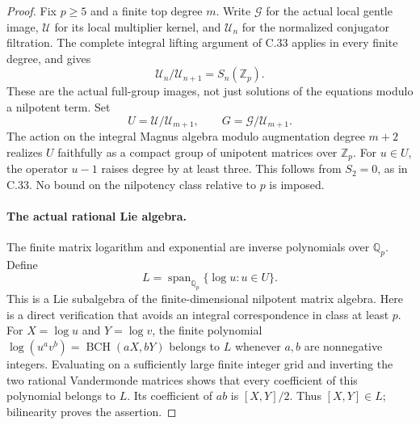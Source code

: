 \begin{proof}
Fix \(p\geq5\) and a finite top degree \(m\).
Write \(\mathcal G\) for the actual local gentle image,
\(\mathcal U\) for its local multiplier kernel, and
\(\mathcal U_n\) for the normalized conjugator filtration.
The complete integral lifting argument of C.33 applies
in every finite degree, and gives
\[
       \mathcal U_n/\mathcal U_{n+1}=S_n(\mathbb Z_p).
                                                               \tag{C38.4}
\]
These are the actual full-group images, not just solutions
of the equations modulo a nilpotent term.
Set
\[
       U=\mathcal U/\mathcal U_{m+1},\qquad
       G=\mathcal G/\mathcal U_{m+1}.
\]
The action on the integral Magnus algebra modulo
augmentation degree \(m+2\) realizes \(U\) faithfully as
a compact group of unipotent matrices over \(\mathbb Z_p\).
For \(u\in U\), the operator \(u-1\) raises degree by at
least three.  This follows from \(S_2=0\), as in C.33.
No bound on the nilpotency class relative to \(p\) is imposed.

\paragraph{The actual rational Lie algebra.}
The finite matrix logarithm and exponential are inverse
polynomials over \(\mathbb Q_p\).  Define
\[
             L=\operatorname{span}_{\mathbb Q_p}
                               \{\log u:u\in U\}.
                                                               \tag{C38.5}
\]
This is a Lie subalgebra of the finite-dimensional nilpotent
matrix algebra.  Here is a direct verification that avoids
an integral correspondence in class at least \(p\).
For \(X=\log u\) and \(Y=\log v\), the finite polynomial
\(\log(u^a v^b)=\operatorname{BCH}(aX,bY)\) belongs to \(L\)
whenever \(a,b\) are nonnegative integers.  Evaluating on a
sufficiently large finite integer grid and inverting the
two rational Vandermonde matrices shows that every
coefficient of this polynomial belongs to \(L\).
Its coefficient of \(ab\) is \([X,Y]/2\).
Thus \([X,Y]\in L\); bilinearity proves the assertion.


\end{proof}
